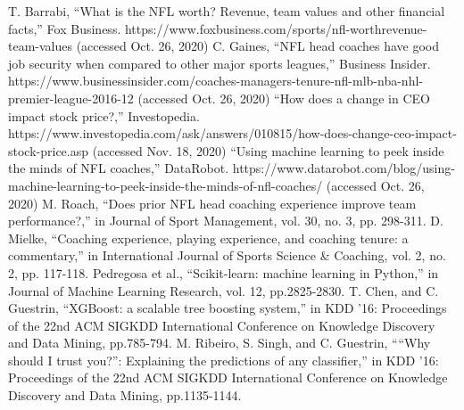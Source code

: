 \documentclass[conference]{IEEEtran}
\begin{document}
\begin{thebibliography}{00}
 T. Barrabi, ``What is the NFL worth? Revenue, team values and other financial facts,'' Fox Business. https://www.foxbusiness.com/sports/nfl-worthrevenue-team-values (accessed Oct. 26, 2020)
 C. Gaines, ``NFL head coaches have good job security when compared to other major sports leagues,'' Business Insider. https://www.businessinsider.com/coaches-managers-tenure-nfl-mlb-nba-nhl-premier-league-2016-12 (accessed Oct. 26, 2020)
 ``How does a change in CEO impact stock price?,'' Investopedia. https://www.investopedia.com/ask/answers/010815/how-does-change-ceo-impact-stock-price.asp (accessed Nov. 18, 2020)
 ``Using machine learning to peek inside the minds of NFL coaches,'' DataRobot. https://www.datarobot.com/blog/using-machine-learning-to-peek-inside-the-minds-of-nfl-coaches/ (accessed Oct. 26, 2020)
 M. Roach, ``Does prior NFL head coaching experience improve team performance?,'' in Journal of Sport Management, vol. 30, no. 3, pp. 298-311.
 D. Mielke, ``Coaching experience, playing experience, and coaching tenure: a commentary,'' in International Journal of Sports Science \& Coaching, vol. 2, no. 2, pp. 117-118.
 Pedregosa et al., ``Scikit-learn: machine learning in Python,'' in Journal of Machine Learning Research, vol. 12, pp.2825-2830.
 T. Chen, and C. Guestrin, ``XGBoost: a scalable tree boosting system,'' in KDD '16: Proceedings of the 22nd ACM SIGKDD International Conference on Knowledge Discovery and Data Mining, pp.785-794.
 M. Ribeiro, S. Singh, and C. Guestrin, ````Why should I trust you?'': Explaining the predictions of any classifier,'' in KDD '16: Proceedings of the 22nd ACM SIGKDD International Conference on Knowledge Discovery and Data Mining, pp.1135-1144.
\end{thebibliography}
\end{document}

